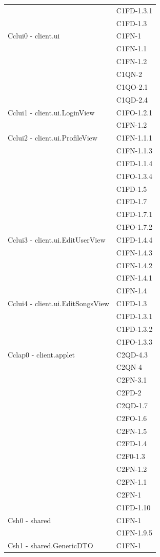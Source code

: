 \begin{footnotesize}
\begin{longtable}[!h]{|l|l|}
& C1FD-1.3.1 \\
& C1FD-1.3 \\ \hline
Cclui0 - client.ui & C1FN-1 \\
& C1FN-1.1 \\
& C1FN-1.2 \\
& C1QN-2 \\
& C1QO-2.1 \\
& C1QD-2.4 \\\hline
Cclui1 - client.ui.LoginView & C1FO-1.2.1 \\
& C1FN-1.2 \\ \hline
Cclui2 - client.ui.ProfileView & C1FN-1.1.1 \\
& C1FN-1.1.3 \\
& C1FD-1.1.4 \\
& C1FO-1.3.4 \\
& C1FD-1.5 \\
& C1FD-1.7 \\
& C1FD-1.7.1 \\
& C1FO-1.7.2 \\\hline
Cclui3 - client.ui.EditUserView & C1FD-1.4.4 \\
& C1FN-1.4.3 \\
& C1FN-1.4.2 \\
& C1FN-1.4.1 \\
& C1FN-1.4 \\\hline
Cclui4 - client.ui.EditSongsView & C1FD-1.3 \\
& C1FD-1.3.1 \\
& C1FD-1.3.2 \\
& C1FO-1.3.3 \\\hline
Cclap0 - client.applet & C2QD-4.3 \\
& C2QN-4 \\
& C2FN-3.1 \\
& C2FD-2 \\
& C2QD-1.7 \\
& C2FO-1.6 \\
& C2FN-1.5 \\
& C2FD-1.4 \\
& C2F0-1.3 \\
& C2FN-1.2 \\
& C2FN-1.1 \\
& C2FN-1 \\
& C1FD-1.10 \\\hline
Csh0 - shared & C1FN-1 \\
& C1FN-1.9.5 \\\hline
Csh1 - shared.GenericDTO & C1FN-1 \\\hline

\end{longtable}
\end{footnotesize}
